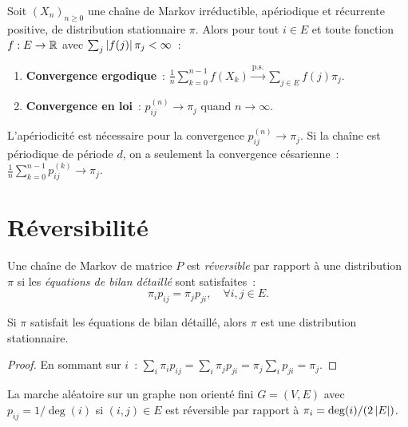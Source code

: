 \begin{theoreme}
\label{thm:ergodique}
Soit $(X_n)_{n \geq 0}$ une cha\^ine de Markov irr\'eductible, ap\'eriodique et
r\'ecurrente positive, de distribution stationnaire $\pi$. Alors pour tout
$i \in E$ et toute fonction $f : E \to \mathbb{R}$ avec $\sum_j \left| f(j) \right| \pi_j < \infty$~:
\begin{enumerate}
  \item \textbf{Convergence ergodique}~:
    $\displaystyle \frac{1}{n} \sum_{k=0}^{n-1} f(X_k) \xrightarrow{\text{p.s.}} \sum_{j \in E} f(j) \pi_j$.
  \item \textbf{Convergence en loi}~: $p_{ij}^{(n)} \to \pi_j$ quand $n \to \infty$.
\end{enumerate}
\end{theoreme}

\begin{attention}[title=\textbf{R\^ole de l'ap\'eriodicit\'e}]
L'ap\'eriodicit\'e est n\'ecessaire pour la convergence $p_{ij}^{(n)} \to \pi_j$.
Si la cha\^ine est p\'eriodique de p\'eriode $d$, on a seulement la convergence
c\'esarienne~: $\frac{1}{n}\sum_{k=0}^{n-1} p_{ij}^{(k)} \to \pi_j$.
\end{attention}

\section{R\'eversibilit\'e}

\begin{definition}[R\'eversibilit\'e]
Une cha\^ine de Markov de matrice $P$ est \emph{r\'eversible} par rapport \`a une
distribution $\pi$ si les \emph{\'equations de bilan d\'etaill\'e} sont satisfaites~:
\[
  \pi_i p_{ij} = \pi_j p_{ji}, \quad \forall i, j \in E.
\]
\end{definition}

\begin{proposition}
Si $\pi$ satisfait les \'equations de bilan d\'etaill\'e, alors $\pi$ est une
distribution stationnaire.
\end{proposition}

\begin{proof}
En sommant sur $i$~: $\sum_i \pi_i p_{ij} = \sum_i \pi_j p_{ji} = \pi_j \sum_i p_{ji} = \pi_j$.
\end{proof}

\begin{exemple}
La marche al\'eatoire sur un graphe non orient\'e fini $G = (V, E)$ avec
$p_{ij} = 1/\deg(i)$ si $(i, j) \in E$ est r\'eversible par rapport \`a
$\pi_i = \deg(i) / (2\left| E \right|)$.
\end{exemple}

